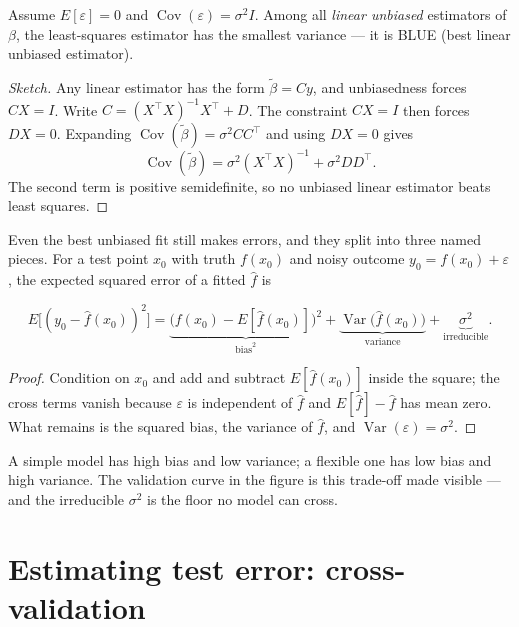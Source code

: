 \documentclass[11pt]{article}
\begin{document}
\begin{theorem}
Assume $E[\varepsilon]=0$ and $\operatorname{Cov}(\varepsilon)=\sigma^2 I$.
Among all \emph{linear unbiased} estimators of $\beta$, the least-squares
estimator has the smallest variance --- it is BLUE (best linear unbiased
estimator).
\end{theorem}
\begin{proof}[Sketch]
Any linear estimator has the form $\tilde\beta = Cy$, and unbiasedness
forces $CX = I$. Write $C = (X^\top X)^{-1}X^\top + D$. The constraint
$CX = I$ then forces $DX = 0$.
Expanding $\operatorname{Cov}(\tilde\beta) = \sigma^2 CC^\top$ and using
$DX=0$ gives
\[
  \operatorname{Cov}(\tilde\beta) = \sigma^2(X^\top X)^{-1} + \sigma^2 DD^\top.
\]
The second term is positive semidefinite, so no unbiased linear estimator
beats least squares.
\end{proof}

Even the best unbiased fit still makes errors, and they split into three
named pieces. For a test point $x_0$ with truth $f(x_0)$ and noisy outcome
$y_0 = f(x_0)+\varepsilon$, the expected squared error of a fitted
$\hat f$ is

\begin{theorem}
\[
  E\big[(y_0 - \hat f(x_0))^2\big]
    = \underbrace{\big(f(x_0) - E[\hat f(x_0)]\big)^2}_{\text{bias}^2}
    + \underbrace{\operatorname{Var}\!\big(\hat f(x_0)\big)}_{\text{variance}}
    + \underbrace{\sigma^2}_{\text{irreducible}}.
\]
\end{theorem}
\begin{proof}
Condition on $x_0$ and add and subtract $E[\hat f(x_0)]$ inside the square;
the cross terms vanish because $\varepsilon$ is independent of $\hat f$ and
$E[\hat f] - \hat f$ has mean zero. What remains is the squared bias, the
variance of $\hat f$, and $\operatorname{Var}(\varepsilon)=\sigma^2$.
\end{proof}

\noindent A simple model has high bias and low variance; a flexible one has
low bias and high variance. The validation curve in the figure is this
trade-off made visible --- and the irreducible $\sigma^2$ is the floor no
model can cross.

\section{Estimating test error: cross-validation}
\end{document}
